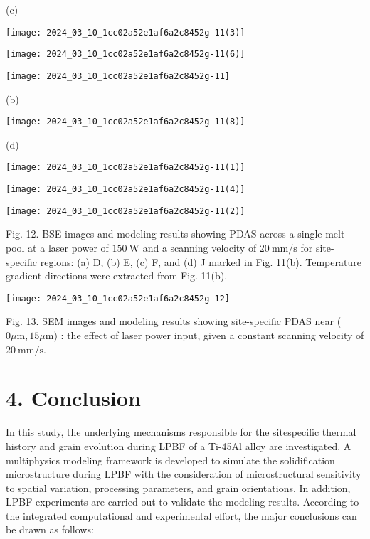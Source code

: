 \documentclass[10pt]{article}
\begin{document}
(c)

\begin{center}
\texttt{[image: 2024\_03\_10\_1cc02a52e1af6a2c8452g-11(3)]}
\end{center}

\begin{center}
\texttt{[image: 2024\_03\_10\_1cc02a52e1af6a2c8452g-11(6)]}
\end{center}

\begin{center}
\texttt{[image: 2024\_03\_10\_1cc02a52e1af6a2c8452g-11]}
\end{center}

(b)

\begin{center}
\texttt{[image: 2024\_03\_10\_1cc02a52e1af6a2c8452g-11(8)]}
\end{center}

(d)

\begin{center}
\texttt{[image: 2024\_03\_10\_1cc02a52e1af6a2c8452g-11(1)]}
\end{center}

\begin{center}
\texttt{[image: 2024\_03\_10\_1cc02a52e1af6a2c8452g-11(4)]}
\end{center}

\begin{center}
\texttt{[image: 2024\_03\_10\_1cc02a52e1af6a2c8452g-11(2)]}
\end{center}

Fig. 12. BSE images and modeling results showing PDAS across a single melt pool at a laser power of $150 \mathrm{~W}$ and a scanning velocity of $20 \mathrm{~mm} / \mathrm{s}$ for site-specific regions: (a) D, (b) E, (c) F, and (d) J marked in Fig. 11(b). Temperature gradient directions were extracted from Fig. 11(b).

\begin{center}
\texttt{[image: 2024\_03\_10\_1cc02a52e1af6a2c8452g-12]}
\end{center}

Fig. 13. SEM images and modeling results showing site-specific PDAS near ( $0 \mu \mathrm{m}, 15 \mu \mathrm{m})$ : the effect of laser power input, given a constant scanning velocity of $20 \mathrm{~mm} / \mathrm{s}$.

\section*{4. Conclusion}
In this study, the underlying mechanisms responsible for the sitespecific thermal history and grain evolution during LPBF of a Ti-45Al alloy are investigated. A multiphysics modeling framework is developed to simulate the solidification microstructure during LPBF with the consideration of microstructural sensitivity to spatial variation, processing parameters, and grain orientations. In addition, LPBF experiments are carried out to validate the modeling results. According to the integrated computational and experimental effort, the major conclusions can be drawn as follows:
\end{document}
